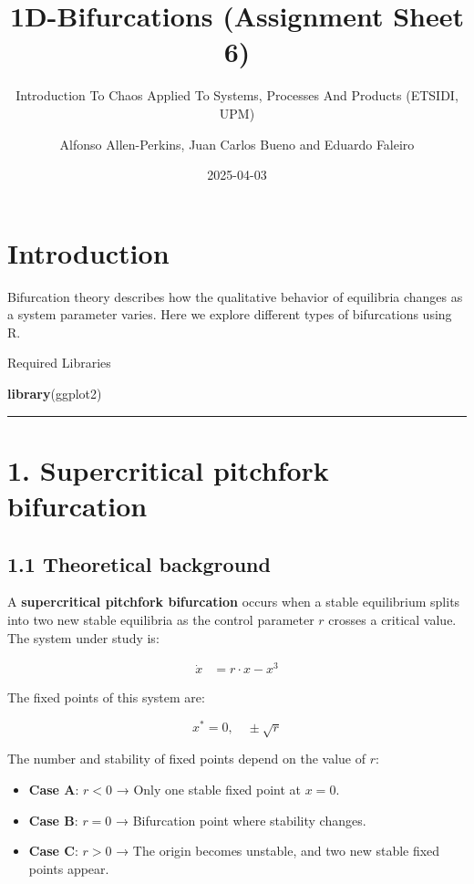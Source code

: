\documentclass[
]{article}
\title{1D-Bifurcations (Assignment Sheet 6)}
\subtitle{Introduction To Chaos Applied To Systems, Processes And
Products (ETSIDI, UPM)}
\author{Alfonso Allen-Perkins, Juan Carlos Bueno and Eduardo Faleiro}
\date{2025-04-03}
\newenvironment{Shaded}{\begin{snugshade}}{\end{snugshade}}
\newcommand{\FunctionTok}[1]{\textcolor[rgb]{0.13,0.29,0.53}{\textbf{#1}}}
\newcommand{\NormalTok}[1]{#1}
\providecommand{\tightlist}{%
  \setlength{\itemsep}{0pt}\setlength{\parskip}{0pt}}
\begin{document}
\maketitle

{
\setcounter{tocdepth}{2}
\tableofcontents
}
\section{Introduction}\label{introduction}

Bifurcation theory describes how the qualitative behavior of equilibria
changes as a system parameter varies. Here we explore different types of
bifurcations using R.

Required Libraries

\begin{Shaded}
\begin{Highlighting}[]
\FunctionTok{library}\NormalTok{(ggplot2)}
\end{Highlighting}
\end{Shaded}

\begin{center}\rule{0.5\linewidth}{0.5pt}\end{center}

\section{1. Supercritical pitchfork
bifurcation}\label{supercritical-pitchfork-bifurcation}

\subsection{\texorpdfstring{\textbf{1.1 Theoretical
background}}{1.1 Theoretical background}}\label{theoretical-background}

A \textbf{supercritical pitchfork bifurcation} occurs when a stable
equilibrium splits into two new stable equilibria as the control
parameter \(r\) crosses a critical value. The system under study is:

\[
\begin{aligned}
\dot{x} &= r \cdot x - x^3
\end{aligned}
\]

The fixed points of this system are:

\[
x^* = 0, \quad \pm\sqrt{r}
\]

The number and stability of fixed points depend on the value of \(r\):

\begin{itemize}
\tightlist
\item
  \textbf{Case A}: \(r < 0\) → Only one stable fixed point at \(x = 0\).
\item
  \textbf{Case B}: \(r = 0\) → Bifurcation point where stability
  changes.
\item
  \textbf{Case C}: \(r > 0\) → The origin becomes unstable, and two new
  stable fixed points appear.
\end{itemize}
\end{document}
